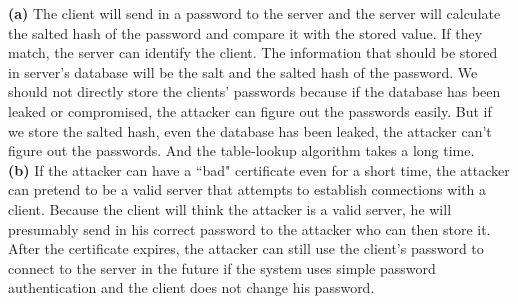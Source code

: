 \documentclass[12pt]{article}
\newenvironment{question}[2][Question]{\begin{trivlist}
\item[\hskip \labelsep {\bfseries #1}\hskip \labelsep {\bfseries #2.}]}{\end{trivlist}}
\begin{document}
\begin{question}{5} 
{\bf (a)} The client will send in a password to the server and the server will calculate the salted hash of the password and compare it with the stored value. If they match, the server can identify the client. The information that should be stored in server's database will be the salt and the salted hash of the password. We should not directly store the clients' passwords because if the database has been leaked or compromised, the attacker can figure out the passwords easily. But if we store the salted hash, even the database has been leaked, the attacker can't figure out the passwords. And the table-lookup algorithm takes a long time.
\\[5pt]
{\bf (b)} If the attacker can have a ``bad" certificate even for a short time, the attacker can pretend to be a valid server that attempts to establish connections with a client. Because the client will think the attacker is a valid server, he will presumably send in his correct password to the attacker who can then store it. After the certificate expires, the attacker can still use the client's password to connect to the server in the future if the system uses simple password authentication and the client does not change his password.

\end{question}

 
 
\end{document}
